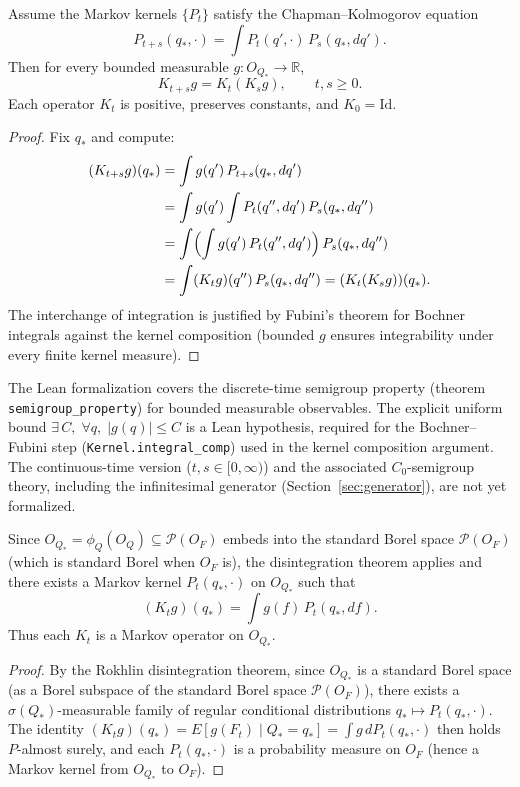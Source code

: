 \begin{theorem}\label{thm:semigroup}
Assume the Markov kernels $\{P_t\}$ satisfy the Chapman--Kolmogorov
equation
\[
P_{t+s}(q_*,\cdot) = \int P_t(q',\cdot)\,P_s(q_*,dq').
\]
Then for every bounded measurable $g:O_{Q_*}\to\mathbb R$,
\[
K_{t+s} g = K_t(K_s g), \qquad t,s\ge0.
\]
Each operator $K_t$ is positive, preserves constants, and $K_0=\mathrm{Id}$.
\end{theorem}

\begin{proof}
Fix $q_*$ and compute:
\begin{align*}
(K_{t+s}g)(q_*)
&= \int g(q')\,P_{t+s}(q_*,dq') \\
&= \int g(q')\int P_t(q'',dq')\,P_s(q_*,dq'') \\
&= \int \Bigl(\int g(q')\,P_t(q'',dq')\Bigr)\,P_s(q_*,dq'') \\
&= \int (K_t g)(q'')\,P_s(q_*,dq'')
= (K_t(K_s g))(q_*).
\end{align*}
The interchange of integration is justified by Fubini's theorem for
Bochner integrals against the kernel composition (bounded $g$ ensures
integrability under every finite kernel measure).
\end{proof}

\begin{remark}
The Lean formalization covers the discrete-time semigroup property
(theorem \texttt{semigroup\_property}) for bounded measurable
observables.  The explicit uniform bound
$\exists\,C,\;\forall q,\;|g(q)|\le C$ is a Lean hypothesis, required
for the Bochner--Fubini step (\texttt{Kernel.integral\_comp}) used in
the kernel composition argument.
The continuous-time version ($t,s\in[0,\infty)$) and the associated
$C_0$-semigroup theory, including the infinitesimal generator
(Section~\ref{sec:generator}), are not yet formalized.
\end{remark}

\begin{proposition}\label{prop:markov-kernel}
Since $O_{Q_*} = \phi_Q(O_Q) \subseteq \mathcal{P}(O_F)$ embeds into
the standard Borel space $\mathcal{P}(O_F)$ (which is standard Borel
when $O_F$ is), the disintegration theorem applies and there exists a
Markov kernel $P_t(q_*,\cdot)$ on $O_{Q_*}$ such that
\[
(K_t g)(q_*) = \int g(f)\,P_t(q_*,df).
\]
Thus each $K_t$ is a Markov operator on $O_{Q_*}$.
\end{proposition}

\begin{proof}
By the Rokhlin disintegration theorem, since $O_{Q_*}$ is a standard
Borel space (as a Borel subspace of the standard Borel space
$\mathcal{P}(O_F)$), there exists a $\sigma(Q_*)$-measurable family
of regular conditional distributions $q_*\mapsto P_t(q_*,\cdot)$.
The identity $(K_t g)(q_*) = E[g(F_t)\mid Q_*=q_*] = \int g\,dP_t(q_*,\cdot)$
then holds $P$-almost surely, and each $P_t(q_*,\cdot)$ is a probability
measure on $O_F$ (hence a Markov kernel from $O_{Q_*}$ to $O_F$).
\end{proof}

